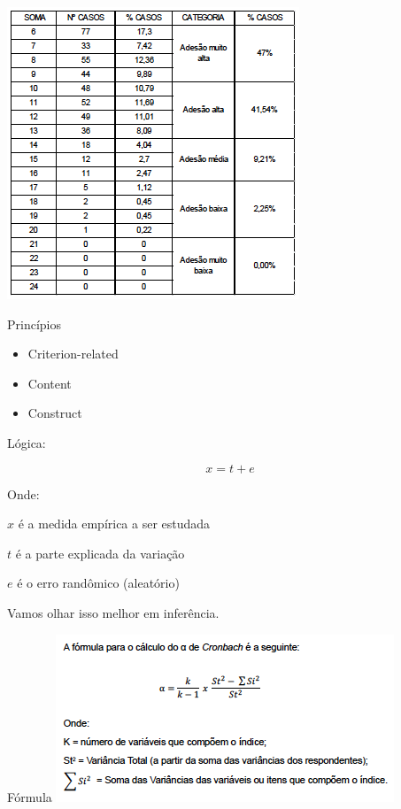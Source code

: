 \documentclass[
  9pt,
  ignorenonframetext,
  aspectratio=169]{beamer}
\begin{document}
\begin{frame}{}
\protect\hypertarget{section-2}{}
\includegraphics{imgs/result_dados.png}
\end{frame}

\begin{frame}{Princípios}
\protect\hypertarget{princuxedpios}{}
\begin{itemize}
\item
  Criterion-related
\item
  Content
\item
  Construct
\end{itemize}

Lógica:

\[x = t + e \]

Onde:

\(x\) é a medida empírica a ser estudada

\(t\) é a parte explicada da variação

\(e\) é o erro randômico (aleatório)

Vamos olhar isso melhor em inferência.
\end{frame}

\begin{frame}{Fórmula}
\protect\hypertarget{fuxf3rmula}{}
\includegraphics{imgs/formula_crb.png}
\end{frame}
\end{document}
